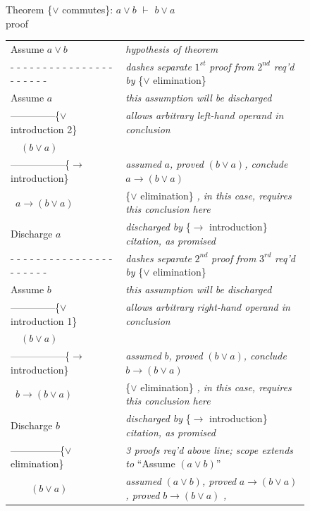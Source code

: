 {\begin{figure}
Theorem \{$\vee$ commutes\}: $a \vee b$ $\vdash$ $b \vee a$ \\
proof
\begin{center}
\begin{tabular}{ll}
Assume $a \vee b$          &\emph{hypothesis of theorem}\\
 - - - - - - - - - - - - - - - - - - - - - -&\emph{dashes separate} $1^{st}$ \emph{proof from} $2^{nd}$ \emph{req'd by} \{$\vee$ elimination\} \\
Assume $a$          &\emph{this assumption will be discharged}\\
--------------\{$\vee$ introduction 2\} &\emph{allows arbitrary left-hand operand in conclusion}\\
~~$(b \vee a)$        &\\
-----------------\{$\rightarrow$ introduction\} &\emph{assumed} $a$\emph{, proved} $(b \vee a)$\emph{, conclude} $a \rightarrow (b \vee a)$ \\
~$a \rightarrow (b \vee a)$ &\{$\vee$ elimination\} \emph{, in this case, requires this conclusion here}\\
Discharge $a$              &\emph{discharged by} \{$\rightarrow$ introduction\} \emph{citation, as promised}\\
 - - - - - - - - - - - - - - - - - - - - - -&\emph{dashes separate} $2^{nd}$ \emph{proof from} $3^{rd}$ \emph{req'd by} \{$\vee$ elimination\}\\
Assume $b$          &\emph{this assumption will be discharged}\\
--------------\{$\vee$ introduction 1\} &\emph{allows arbitrary right-hand operand in conclusion}\\
~~$(b \vee a)$        &\\
-----------------\{$\rightarrow$ introduction\} &\emph{assumed} $b$\emph{, proved} $(b \vee a)$\emph{, conclude} $b \rightarrow (b \vee a)$\\
~$b \rightarrow (b \vee a)$ &\{$\vee$ elimination\} \emph{, in this case, requires this conclusion here}\\
Discharge $b$              &\emph{discharged by} \{$\rightarrow$ introduction\} \emph{citation, as promised}\\
---------------\{$\vee$ elimination\}       &\emph{3 proofs req'd above line; scope extends to} ``Assume $(a \vee b)$''\\
~~~~$(b \vee a)$        &\emph{assumed} $(a \vee b)$\emph{, proved} $a \rightarrow (b \vee a)$\emph{, proved} $b \rightarrow (b \vee a)$ \emph{,}\\

\end{tabular}
\end{center}
\end{figure}}
